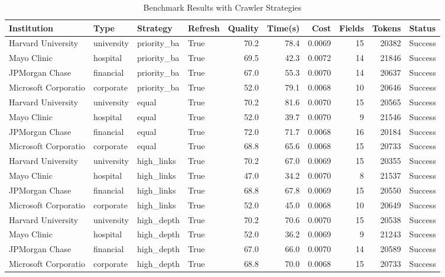 \begin{table}[h!]
\centering
\caption{Benchmark Results with Crawler Strategies}
\label{tab:crawler_strategies}
\begin{tabular}{|l|l|l|l|r|r|r|r|r|l|}
\hline
Institution & Type & Strategy & Refresh & Quality & Time(s) & Cost & Fields & Tokens & Status \\
\hline
Harvard University & university & priority\_ba & True & 70.2 & 78.4 & 0.0069 & 15 & 20382 & Success \\
Mayo Clinic & hospital & priority\_ba & True & 69.5 & 42.3 & 0.0072 & 14 & 21846 & Success \\
JPMorgan Chase & financial & priority\_ba & True & 67.0 & 55.3 & 0.0070 & 14 & 20637 & Success \\
Microsoft Corporatio & corporate & priority\_ba & True & 52.0 & 79.1 & 0.0068 & 10 & 20646 & Success \\
Harvard University & university & equal & True & 70.2 & 81.6 & 0.0070 & 15 & 20565 & Success \\
Mayo Clinic & hospital & equal & True & 52.0 & 39.7 & 0.0070 & 9 & 21546 & Success \\
JPMorgan Chase & financial & equal & True & 72.0 & 71.7 & 0.0068 & 16 & 20184 & Success \\
Microsoft Corporatio & corporate & equal & True & 68.8 & 65.6 & 0.0068 & 15 & 20733 & Success \\
Harvard University & university & high\_links & True & 70.2 & 67.0 & 0.0069 & 15 & 20355 & Success \\
Mayo Clinic & hospital & high\_links & True & 47.0 & 34.2 & 0.0070 & 8 & 21537 & Success \\
JPMorgan Chase & financial & high\_links & True & 68.8 & 67.8 & 0.0069 & 15 & 20550 & Success \\
Microsoft Corporatio & corporate & high\_links & True & 52.0 & 45.0 & 0.0068 & 10 & 20649 & Success \\
Harvard University & university & high\_depth & True & 70.2 & 70.6 & 0.0070 & 15 & 20538 & Success \\
Mayo Clinic & hospital & high\_depth & True & 52.0 & 36.2 & 0.0069 & 9 & 21243 & Success \\
JPMorgan Chase & financial & high\_depth & True & 67.0 & 66.0 & 0.0070 & 14 & 20589 & Success \\
Microsoft Corporatio & corporate & high\_depth & True & 68.8 & 70.0 & 0.0068 & 15 & 20733 & Success \\
\hline
\end{tabular}
\end{table}
